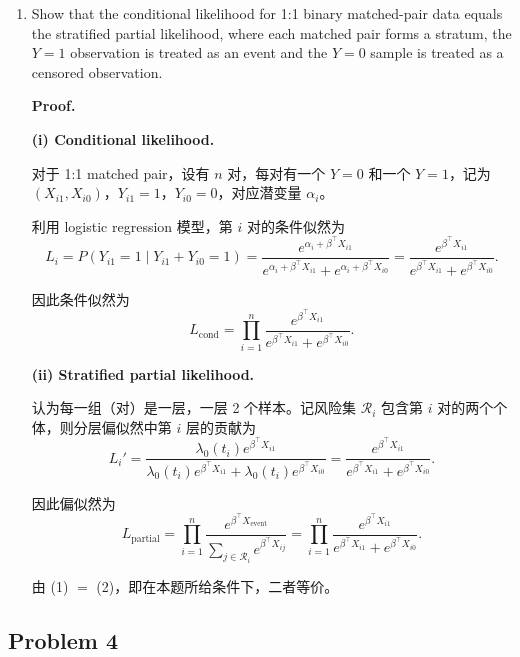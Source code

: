 \begin{enumerate}
\item Show that the conditional likelihood for 1:1 binary matched-pair data equals the stratified partial likelihood, where each matched pair forms a stratum, the $Y=1$ observation is treated as an event and the $Y=0$ sample is treated as a censored observation.

\textbf{Proof.}

\textbf{(i) Conditional likelihood.}

对于 1:1 matched pair，设有 $n$ 对，每对有一个 $Y=0$ 和一个 $Y=1$，记为 $(X_{i1}, X_{i0})$，$Y_{i1}=1$，$Y_{i0}=0$，对应潜变量 $\alpha_i$。

利用 logistic regression 模型，第 $i$ 对的条件似然为
{\small
\[
L_i = P(Y_{i1}=1 \mid Y_{i1}+Y_{i0}=1)
= \frac{e^{\alpha_i + \beta^\top X_{i1}}}{e^{\alpha_i + \beta^\top X_{i1}} + e^{\alpha_i + \beta^\top X_{i0}}}
= \frac{e^{\beta^\top X_{i1}}}{e^{\beta^\top X_{i1}} + e^{\beta^\top X_{i0}}}.
\]
}

因此条件似然为
\[
\boxed{L_{\text{cond}} = \prod_{i=1}^{n} \frac{e^{\beta^\top X_{i1}}}{e^{\beta^\top X_{i1}} + e^{\beta^\top X_{i0}}}.} \tag{1}
\]

\textbf{(ii) Stratified partial likelihood.}

认为每一组（对）是一层，一层 2 个样本。记风险集 $\mathcal{R}_i$ 包含第 $i$ 对的两个个体，则分层偏似然中第 $i$ 层的贡献为
{\small
\[
L_i' = \frac{\lambda_0(t_i)e^{\beta^\top X_{i1}}}{\lambda_0(t_i)e^{\beta^\top X_{i1}} + \lambda_0(t_i)e^{\beta^\top X_{i0}}}
= \frac{e^{\beta^\top X_{i1}}}{e^{\beta^\top X_{i1}} + e^{\beta^\top X_{i0}}}.
\]
}

因此偏似然为
\[
\boxed{L_{\text{partial}} = \prod_{i=1}^{n} \frac{e^{\beta^\top X_{\text{event}}}}{\sum_{j \in \mathcal{R}_i} e^{\beta^\top X_{ij}}}
= \prod_{i=1}^{n} \frac{e^{\beta^\top X_{i1}}}{e^{\beta^\top X_{i1}} + e^{\beta^\top X_{i0}}}.} \tag{2}
\]

由 (1) $=$ (2)，即在本题所给条件下，二者等价。 \qedhere
\end{enumerate}

\subsection{Problem 4}

